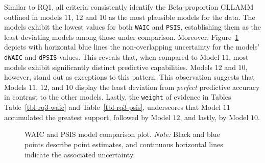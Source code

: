 \documentclass[
  authoryear,
  preprint,
  1p]{elsarticle}
\begin{document}
Similar to RQ1, all criteria consistently identify the Beta-proportion
GLLAMM outlined in models \(11\), \(12\) and \(10\) as the most
plausible models for the data. The models exhibit the lowest values for
both \texttt{WAIC} and \texttt{PSIS}, establishing them as the least
deviating models among those under comparison. Moreover,
Figure~\ref{fig-rq3-waic-psis} depicts with horizontal blue lines the
non-overlapping uncertainty for the models' \texttt{dWAIC} and
\texttt{dPSIS} values. This reveals that, when compared to Model \(11\),
most models exhibit significantly distinct predictive capabilities.
Models \(12\) and \(10\), however, stand out as exceptions to this
pattern. This observation suggests that Models \(11\), \(12\), and
\(10\) display the least deviation from \emph{perfect} predictive
accuracy in contrast to the other models. Lastly, the \texttt{weight} of
evidence in Tables Table~\ref{tbl-rq3-waic} and
Table~\ref{tbl-rq3-psis}, underscores that Model \(11\) accumulated the
greatest support, followed by Model \(12\), and lastly, by Model \(10\).

\label{cell-fig-rq3-waic-psis}
\begin{figure}[H]


\caption{\label{fig-rq3-waic-psis}WAIC and PSIS model comparison plot.
\emph{Note:} Black and blue points describe point estimates, and
continuous horizontal lines indicate the associated uncertainty.}

\end{figure}%
\end{document}
